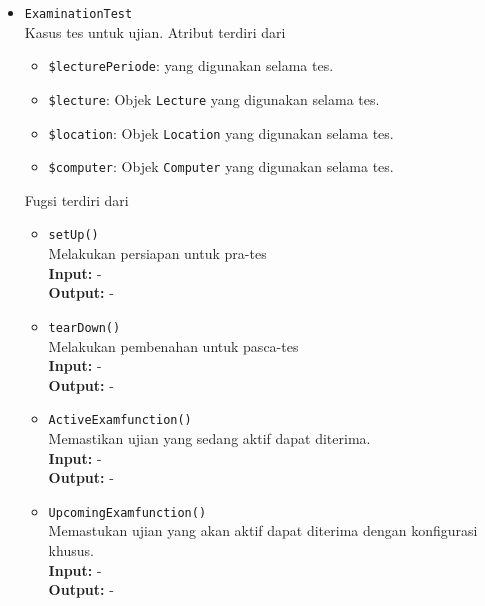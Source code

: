 \begin{itemize}
            \item \texttt{ExaminationTest} \\
                Kasus tes untuk ujian.
                Atribut terdiri dari
                \begin{itemize}
                    \item \texttt{\$lecturePeriode}:  yang digunakan selama tes.
                    \item \texttt{\$lecture}: Objek \texttt{Lecture} yang digunakan selama tes.
                    \item \texttt{\$location}: Objek \texttt{Location} yang digunakan selama tes.
                    \item \texttt{\$computer}: Objek \texttt{Computer} yang digunakan selama tes.
                \end{itemize}
                Fugsi terdiri dari
                \begin{itemize}
                    \item \texttt{setUp()} \\
                        Melakukan persiapan untuk pra-tes \\
                        \textbf{Input:} -\\
                        \textbf{Output:} -
                    
                    \item \texttt{tearDown()} \\
                        Melakukan pembenahan untuk pasca-tes \\
                        \textbf{Input:} - \\
                        \textbf{Output:} -
                        
                    \item \texttt{ActiveExamfunction()} \\
                        Memastikan ujian yang sedang aktif dapat diterima. \\
                        \textbf{Input:} - \\
                        \textbf{Output:} -
                        
                    \item \texttt{UpcomingExamfunction()} \\
                        Memastukan ujian yang akan aktif dapat diterima dengan konfigurasi khusus. \\
                        \textbf{Input:} - \\
                        \textbf{Output:} -
                        

\end{itemize}
\end{itemize}

